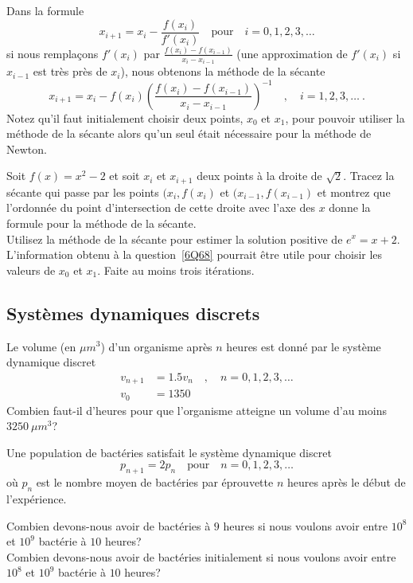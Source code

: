 \begin{question}
Dans la formule
\[
x_{i+1} = x_i  - \frac{f(x_i)}{f'(x_i)} \quad \text{pour}
\quad i=0, 1, 2, 3, \ldots
\]
si nous remplaçons $f'(x_i)$ par
$\displaystyle \frac{f(x_i)-f(x_{i-1})}{x_i - x_{i-1}}$ (une
approximation de $f'(x_i)$ si $x_{i-1}$ est très près de $x_i$), nous
obtenons la méthode de la sécante
\[
x_{i+1} = x_i  - f(x_i)\left(\frac{f(x_i)-f(x_{i-1})}{x_i - x_{i-1}}\right)^{-1}
\quad , \quad i=1, 2, 3, \ldots \ .
\]
Notez qu'il faut initialement choisir deux points, $x_0$ et $x_1$,
pour pouvoir utiliser la méthode de la sécante alors qu'un seul était
nécessaire pour la méthode de Newton.

  Soit $f(x) = x^2 -2$ et soit $x_i$ et $x_{i+1}$ deux points
à la droite de $\sqrt{2}$.  Tracez la sécante qui passe par les points
$(x_i, f(x_i)$ et $(x_{i-1}, f(x_{i-1})$ et montrez que l'ordonnée du
point d'intersection de cette droite avec l'axe des $x$ donne la
formule pour la méthode de la sécante.\\
 Utilisez la méthode de la sécante pour estimer la solution
positive de $e^x = x + 2$.  L'information obtenu à la
question~\ref{6Q68} pourrait être utile pour choisir les valeurs de
$x_0$ et $x_1$.  Faite au moins trois itérations.
\label{6Q69}
\end{question}

\subsection{Systèmes dynamiques discrets}

\begin{question}[\life]
Le volume (en $\mu m^3$) d'un organisme après $n$ heures est donné par le
système dynamique discret
\begin{align*}
v_{n+1} &= 1.5 v_n \quad , \quad n=0, 1, 2, 3, \ldots \\
v_0 &= 1350
\end{align*}
Combien faut-il d'heures pour que l'organisme atteigne un volume d'au moins
$3250\ \mu m^3$?
\label{6Q70}
\end{question}

\begin{question}[\life]
Une population de bactéries satisfait le système dynamique discret
\[
p_{n+1} = 2 p_n \quad \text{pour} \quad n=0, 1, 2, 3, \ldots
\]
où $p_n$ est le nombre moyen de bactéries par éprouvette $n$ heures
après le début de l'expérience.

 Combien devons-nous avoir de bactéries à $9$ heures si nous
voulons avoir entre $10^8$ et $10^9$ bactérie à $10$ heures?\\
 Combien devons-nous avoir de bactéries initialement si nous
voulons avoir entre $10^8$ et $10^9$ bactérie à $10$ heures?
\label{6Q71}
\end{question}

